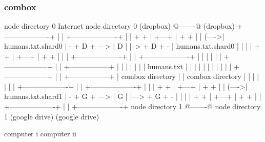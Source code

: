 \begin{frame}[fragile]
  \frametitle{combox}

  {\tiny
  \begin{semiverbatim}

         node directory 0                Internet              node directory 0
         (dropbox)                       @-------@             (dropbox)
        +-------------------+            |       |            +-------------------+
        |                   |    + +     | +---+ |     + +    |                   |
  (---->| humans.txt.shard0 | - + D + ---> | D | |--> + D + - | humans.txt.shard0 |
  |     |                   |    + +     | +---+ |     + +    |                   |
  |     +-------------------+            |       |            +-------------------+
  |                                      |       |
  |                                      |       |
 +------------------+                    |       |                        +-----------------+
 |                  |                    |       |                        |                 |
 |  humans.txt      |                    |       |                        |                 |
 |                  |                    |       |                        |                 |
 +------------------+                    |       |                        +-----------------+
  |  combox directory                    |       |                      combox directory
  |                                      |       |
  |                                      |       |
  |     +-------------------+            |       |             +-------------------+
  |     |                   |    + +     | +---+ |      + +    |                   |
  (---->| humans.txt.shard1 | - + G + ---> | G | |---> + G + - |                   |
        |                   |    + +     | +---+ |      + +    |                   |
        +-------------------+            |       |             +-------------------+
         node directory 1                @-------@              node directory 1
         (google drive)                                         (google drive)

  computer i                                                                    computer ii
  \end{semiverbatim}
  }

\end{frame}

